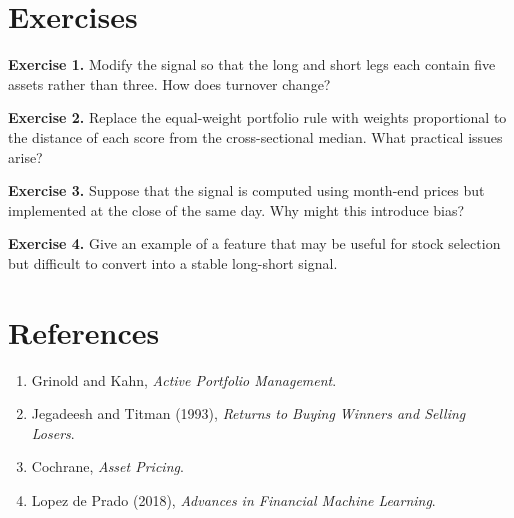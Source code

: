 \documentclass[11pt]{article}
\newcommand{\answerlines}[1]{\vspace{#1\baselineskip}}
\begin{document}
\section*{Exercises}

\textbf{Exercise 1.} Modify the signal so that the long and short legs each
contain five assets rather than three. How does turnover change?

\answerlines{6}

\textbf{Exercise 2.} Replace the equal-weight portfolio rule with weights
proportional to the distance of each score from the cross-sectional median.
What practical issues arise?

\answerlines{6}

\textbf{Exercise 3.} Suppose that the signal is computed using month-end prices
but implemented at the close of the same day. Why might this introduce bias?

\answerlines{6}

\textbf{Exercise 4.} Give an example of a feature that may be useful for stock
selection but difficult to convert into a stable long-short signal.

\answerlines{6}

\section*{References}

\begin{enumerate}
  \item Grinold and Kahn, \textit{Active Portfolio Management}.
  \item Jegadeesh and Titman (1993), \textit{Returns to Buying Winners and Selling Losers}.
  \item Cochrane, \textit{Asset Pricing}.
  \item Lopez de Prado (2018), \textit{Advances in Financial Machine Learning}.
\end{enumerate}
\end{document}

